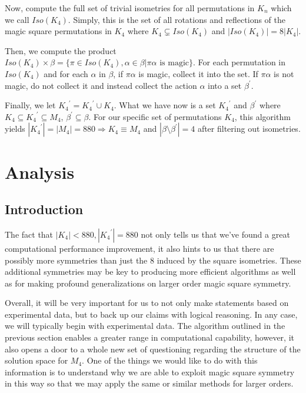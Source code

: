 \documentclass[12pt]{report}
\begin{document}
\par Now, compute the full set of trivial isometries for all permutations in $K_n$ which we call
$Iso(K_4)$. Simply, this is the set of all rotations and reflections of the magic square
permutations in $K_4$ where $K_4\subsetneq Iso(K_4)$ and $|Iso(K_4)| = 8|K_4|$.

\par Then, we compute the product $Iso(K_4)\times\beta = \{\pi\in Iso(K_4),\alpha\in\beta |
  \pi\alpha \text{ is magic}\}$. For each permutation in $Iso(K_4)$ and for each $\alpha$ in
$\beta$,
if $\pi\alpha$ is magic, collect it into the set. If $\pi\alpha$ is not magic, do not collect it
and instead collect the action $\alpha$ into a set ${\beta}^\prime$.

\par Finally, we let ${K_4}^\prime = {K_4}^\prime \cup K_4$. What we have now is a set
${K_4}^\prime$ and ${\beta}^\prime$ where $K_4 \subseteq {K_4}^\prime \subseteq M_4$,
${\beta}^\prime \subseteq \beta$. For our specific set of permutations $K_4$, this algorithm yields
$|{K_4}^\prime| = |M_4| = 880 \Rightarrow K_4 \equiv M_4$ and $|\beta \setminus{\beta}^\prime| = 4$
after filtering out isometries.

\chapter{Analysis}

\section{Introduction}

\par The fact that $\left|K_4\right|< 880, \left|{K_4}^\prime\right|=880$ not only tells us that
we've found a great computational performance improvement, it also hints to us that there are
possibly more symmetries than just the 8 induced by the square isometries. These additional
symmetries may be key to producing more efficient algorithms as well as for making profound
generalizations on larger order magic square symmetry.

\par Overall, it will be very important for us to not only make statements based on experimental
data, but to back up our claims with logical reasoning. In any case, we will typically begin with
experimental data. The algorithm outlined in the previous section enables a greater range in
computational capability, however, it also opens a door to a whole new set of questioning regarding
the structure of the solution space for $M_4$. One of the things we would like to do with this
information is to understand why we are able to exploit magic square symmetry in this way so that
we may apply the same or similar methods for larger orders.
\end{document}
